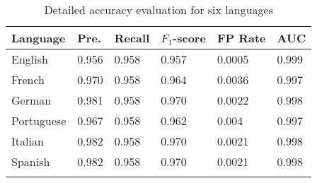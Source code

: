 \documentclass[10pt,conference,compsocconf,letterpaper]{IEEEtran}
\begin{document}
\begin{table}[th]
\caption{Detailed accuracy evaluation for six languages} \centering
	\begin{tabular}{l l l l l l }
	\textbf{Language}	& \textbf{Pre.} & \textbf{Recall}  & \textbf{$F_1$-score}  &\textbf{FP Rate}  & \textbf{AUC} \\ \hline
English & 0.956 &	0.958 &		0.957 &		0.0005	 &	0.999 \\
French & 0.970 &	0.958 &		0.964 &		0.0036	 &	0.997 \\
German &  0.981 &	0.958 &		0.970 &		0.0022 &		0.998 \\
Portuguese &  0.967	 &	0.958	& 0.962 &		0.004	 &	0.997 \\
Italian &  0.982	 &	0.958	 &	0.970	 &	0.0021 &	0.998 \\
Spanish &  0.982	 &	0.958	 &	0.970	 &	0.0021	 &	0.998 \\
		\label{tbl:main-eval-table}
 \end{tabular}
\end{table}
\end{document}

